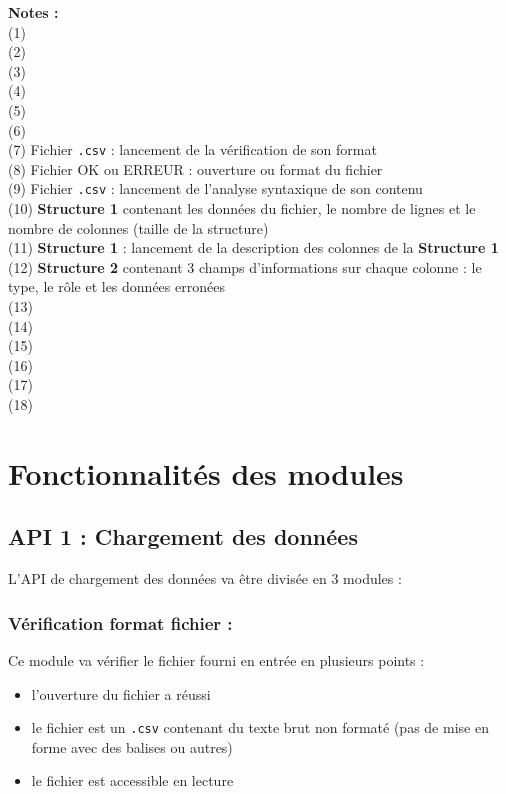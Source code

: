 		\hspace{-\parindent}\textbf{Notes :}\\
			(1) \\
			(2) \\
			(3) \\
			(4) \\
			(5) \\
			(6) \\
			(7) Fichier \lstinline!.csv! : lancement de la vérification de son format\\
			(8) Fichier OK ou ERREUR : ouverture ou format du fichier\\
			(9) Fichier \lstinline!.csv! : lancement de l'analyse syntaxique de son contenu\\
			(10) \textbf{Structure 1} contenant les données du fichier, le nombre de lignes et le nombre de colonnes (taille de la structure)\\
			(11) \textbf{Structure 1} : lancement de la description des colonnes de la \textbf{Structure 1}\\
			(12) \textbf{Structure 2} contenant 3 champs d'informations sur chaque colonne : le type, le rôle et les données erronées\\
			(13) \\
			(14) \\
			(15) \\
			(16) \\
			(17) \\
			(18) \\
	
	\section{Fonctionnalités des modules}
		\subsection{API 1 : Chargement des données}
			L'API de chargement des données va être divisée en 3 modules :
			
			\subsubsection{Vérification format fichier :}
				Ce module va vérifier le fichier fourni en entrée en plusieurs points :
				\begin{itemize}
					\item l'ouverture du fichier a réussi
					\item le fichier est un \lstinline!.csv! contenant du texte brut non formaté (pas de mise en forme avec des balises ou autres)
					\item le fichier est accessible en lecture
				\end{itemize}
			
